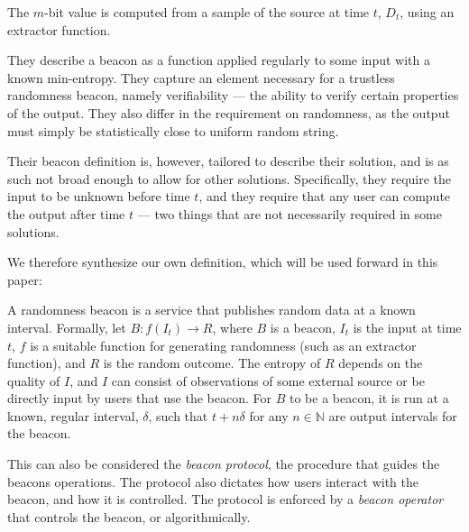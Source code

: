 The $m$-bit value is computed from a sample of the source at time $t$, $D_t$, using an extractor function. 

They describe a beacon as a function applied regularly to some input with a known min-entropy.
They capture an element necessary for a trustless randomness beacon, namely verifiability --- the ability to verify certain properties of the output.
They also differ in the requirement on randomness, as the output must simply be statistically close to uniform random string.

Their beacon definition is, however, tailored to describe their solution, and is as such not broad enough to allow for other solutions.
Specifically, they require the input to be unknown before time $t$, and they require that any user can compute the output after time $t$ --- two things that are not necessarily required in some solutions.


We therefore synthesize our own definition, which will be used forward in this paper:

A  randomness beacon is a service that publishes random data at a known interval.
Formally, let $B: f(I_t) \rightarrow R$, where $B$ is a beacon, $I_t$ is the input at time $t$, $f$ is a suitable function for generating randomness (such as an extractor function), and $R$ is the random outcome. The entropy of $R$ depends on the quality of $I$, and $I$ can consist of observations of some external source or be directly input by users that use the beacon. 
For $B$ to be a beacon, it is run at a known, regular interval, $\delta$, such that $t+n\delta$ for any $n \in \mathbb{N}$ are output intervals for the beacon.

This can also be considered the \emph{beacon protocol}, the procedure that guides the beacons operations. The protocol also dictates how users interact with the beacon, and how it is controlled. The protocol is enforced by a \emph{beacon operator} that controls the beacon, or algorithmically. 



